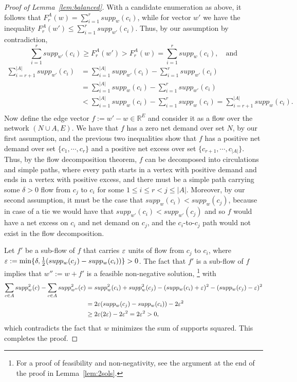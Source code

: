 \begin{proof}[Proof of Lemma~\ref{lem:balanced}]
With a candidate enumeration as above, it follows that $F^A_r(w)=\sum_{i=1}^r supp_w(c_i)$, while for vector $w'$ we have the inequality $F^A_r(w')\leq \sum_{i=1}^r supp_{w'}(c_i)$. 
Thus, by our assumption by contradiction, 
$$\sum_{i=1}^r supp_{w'}(c_i) \geq F_r^A(w') > F_r^A(w) = \sum_{i=1}^r supp_{w}(c_i), \quad \text{and}$$
\begin{align*}
    \sum_{i=r+1}^{|A|} supp_{w'}(c_i) &= \sum_{i=1}^{|A|} supp_{w'}(c_i) - \sum_{i=1}^{r} supp_{w'}(c_i) \\
    & = \sum_{i=1}^{|A|} supp_{w}(c_i) - \sum_{i=1}^{r} supp_{w'}(c_i) \\
    & < \sum_{i=1}^{|A|} supp_{w}(c_i) - \sum_{i=1}^{r} supp_{w}(c_i) 
    = \sum_{i=r+1}^{|A|} supp_{w}(c_i). \\
\end{align*}
Now define the edge vector $f:=w'-w\in\mathbb{R}^E$ and consider it as a flow over the network $(N\cup A, E)$. 
We have that $f$ has a zero net demand over set $N$, by our first assumption, and the previous two inequalities show that $f$ has a positive net demand over set $\{c_1, \cdots, c_r\}$ and a positive net excess over set $\{c_{r+1}, \cdots, c_{|A|}\}$. Thus, by the flow decomposition theorem, $f$ can be decomposed into circulations and simple paths, where every path starts in a vertex with positive demand and ends in a vertex with positive excess, and there must be a simple path carrying some $\delta>0$ flow from $c_j$ to $c_i$ for some $1\leq i\leq r<j\leq |A|$. 
Moreover, by our second assumption, it must be the case that $supp_w(c_i)<supp_w(c_j)$, because in case of a tie we would have that $supp_{w'}(c_i)<supp_{w'}(c_j)$ and so $f$ would have a net excess on $c_i$ and net demand on $c_j$, and the $c_i$-to-$c_j$ path would not exist in the flow decomposition.

Let $f'$ be a sub-flow of $f$ that carries $\varepsilon$ units of flow from $c_j$ to $c_i$, where $\varepsilon:=\min\{\delta, \frac{1}{2}(supp_w(c_j) - supp_w(c_i))\}>0$. 
The fact that $f'$ is a sub-flow of $f$ implies that $w'':=w+f'$ is a feasible non-negative solution,%
\footnote{For a proof of feasibility and non-negativity, see the argument at the end of the proof in Lemma~\ref{lem:2sols}.} 
with 
\begin{align*}
    \sum_{c\in A} supp_{w}^2(c) - \sum_{c\in A} supp_{w''}^2(c) &= supp_{w}^2(c_i) + supp_w^2(c_j) - (supp_{w}(c_i) +\varepsilon)^2 - (supp_{w}(c_j) - \varepsilon)^2\\
    &= 2\varepsilon(supp_w(c_j) - supp_w(c_i)) - 2\varepsilon^2 \\
    &\geq 2\varepsilon(2\varepsilon) - 2\varepsilon^2 = 2\varepsilon^2>0,
\end{align*}
which contradicts the fact that $w$ minimizes the sum of supports squared. This completes the proof. 
\end{proof}


